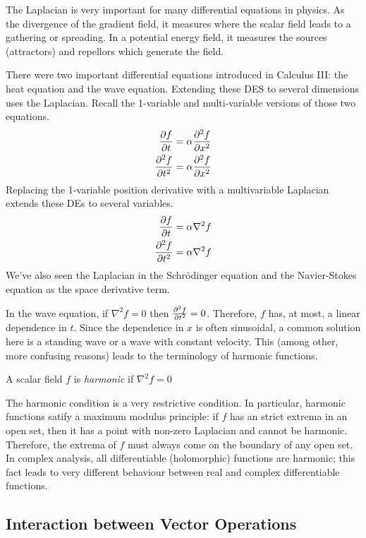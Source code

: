 \documentclass[fleqn,letterpaper]{report}
\begin{document}
The Laplacian is very important for many differential
equations in physics. As the divergence of the gradient
field, it measures where the scalar field leads to a gathering
or spreading. In a potential energy field, it measures the
sources (attractors) and repellors which generate the field.

There were two important differential equations introduced in 
Calculus III: the heat equation and the wave equation.
Extending these DES to several dimensions uses the Laplacian.
Recall the 1-variable and multi-variable versions of those
two equations.
\begin{align*}
\frac{\partial f}{\partial t} & = \alpha \frac{\partial^2 f}{\partial x^2} \\
\frac{\partial^2 f}{\partial t^2} & = \alpha \frac{\partial^2 f}{\partial x^2} 
\end{align*}
Replacing the 1-variable position derivative with a
multivariable Laplacian extends these DEs to several
variables.
\begin{align*}
\frac{\partial f}{\partial t} & = \alpha \nabla^2 f \\
\frac{\partial^2 f}{\partial t^2} & = \alpha \nabla^2 f \\
\end{align*}
We've also seen the Laplacian in the Schr\"odinger
equation and the Navier-Stokes equation as the space
derivative term. 

In the wave equation, if $\nabla^2 f = 0$ then $\frac{\partial^2
f}{\partial t^2} = 0$. Therefore, $f$ has, at most, a linear
dependence in $t$. Since the dependence in $x$ is often
sinusoidal, a common solution here is a standing wave or a
wave with constant velocity. This (among other, more
confusing reasons) leads to the terminology of harmonic
functions. 

\begin{defn}
A scalar field $f$ is \emph{harmonic} if $\nabla^2 f = 0$
\end{defn}

The harmonic condition is a very 
restrictive condition. In particular, harmonic functions
satify a maximum modulus
principle: if $f$ has an strict extrema in an open set, then
it has a point with non-zero Laplacian and cannot be harmonic.
Therefore, the extrema of $f$ must always come on the boundary
of any open set. In complex analysis, all differentiable
(holomorphic) functions are harmonic; this fact leads to very
different behaviour between real and complex differentiable
functions.

\subsection{Interaction between Vector Operations}
\label{interactions}
\end{document}
